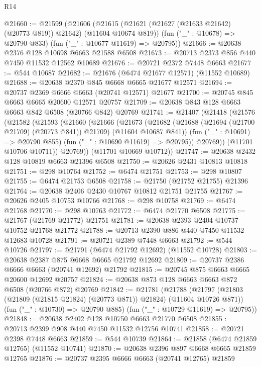 \begin{lexlean}{R14}
\begin{coremodule}
{{{{{{{{{{{{{{{{{{{{{{{{{{{{{{{{{{{{{{{{{{{{{{{{{{{{{{{{{{{{{{{{{{{{{{{{{{{{{{{{{{@21660 := @21599
    (@21606
      (@21615 (@21621 (@21627 (@21633 @21642) (@20773 @819)) @21642) (@11604 @10674 @819))
      (fun ("_" : @10678) => @20790 @833)
      (fun ("_" : @10677 @11619) => @20795))
@21666 := @20638 @2376 @128 @10698 @6663 @21588 @6508
@21673 := @20713 @2373 @856 @440 @7450 @11532 @12562 @10689
@21676 := @20721 @2372 @7448 @6663
@21677 := @544 @10687
@21682 := @21676 (@6474 @21677 @12571) (@11552 @10689)
@21688 := @20638 @2370 @845 @6668 @6665 @21677 @12571
@21694 := @20737 @2369 @6666 @6663 (@20741 @12571) @21677
@21700 := @20745 @845 @6663 @6665 @20600 @12571 @20757
@21709 := @20638 @843 @128 @6663 @6663 @842 @6508 (@20766 @842) @20769
@21741 := @21407
    (@21418
      (@21576
        (@21582
          (@21593
            (@21660
              (@21666
                (@21673
                  (@21682
                    (@21688 (@21694 (@21700 @21709) (@20773 @841)) @21709)
                    (@11604 @10687 @841))
                  (fun ("_" : @10691) => @20790 @855)
                  (fun ("_" : @10690 @11619) => @20795))
                @20769))
            (@11701 @10706 @10711))
          @20769))
      (@11701 @10669 @10712))
@21747 := @20638 @2432 @128 @10819 @6663 @21396 @6508
@21750 := @20626 @2431 @10813 @10818
@21751 := @298 @10764
@21752 := @6474 @21751
@21753 := @298 @10807
@21755 := @6474 @21753 @6508
@21758 := @21750 (@21752 @21755) @21396
@21764 := @20638 @2406 @2430 @10767 @10812 @21751 @21755
@21767 := @20626 @2405 @10753 @10766
@21768 := @298 @10758
@21769 := @6474 @21768
@21770 := @298 @10763
@21772 := @6474 @21770 @6508
@21775 := @21767 (@21769 @21772) @21751
@21781 := @20638 @2393 @2404 @10737 @10752 @21768 @21772
@21788 := @20713 @2390 @886 @440 @7450 @11532 @12683 @10728
@21791 := @20721 @2389 @7448 @6663
@21792 := @544 @10726
@21797 := @21791 (@6474 @21792 @12692) (@11552 @10728)
@21803 := @20638 @2387 @875 @6668 @6665 @21792 @12692
@21809 := @20737 @2386 @6666 @6663 (@20741 @12692) @21792
@21815 := @20745 @875 @6663 @6665 @20600 @12692 @20757
@21824 := @20638 @873 @128 @6663 @6663 @872 @6508 (@20766 @872) @20769
@21842 := @21781
    (@21788
      (@21797 (@21803 (@21809 (@21815 @21824) (@20773 @871)) @21824) (@11604 @10726 @871))
      (fun ("_" : @10730) => @20790 @885)
      (fun ("_" : @10729 @11619) => @20795))
@21848 := @20638 @2402 @128 @10750 @6663 @21770 @6508
@21855 := @20713 @2399 @908 @440 @7450 @11532 @12756 @10741
@21858 := @20721 @2398 @7448 @6663
@21859 := @544 @10739
@21864 := @21858 (@6474 @21859 @12765) (@11552 @10741)
@21870 := @20638 @2396 @897 @6668 @6665 @21859 @12765
@21876 := @20737 @2395 @6666 @6663 (@20741 @12765) @21859
}}}}}}}}}}}}}}}}}}}}}}}}}}}}}}}}}}}}}}}}}}}}}}}}}}}}}}}}}}}}}}}}}}}}}}}}}}}}}}}}}}
\end{coremodule}
\end{lexlean}
